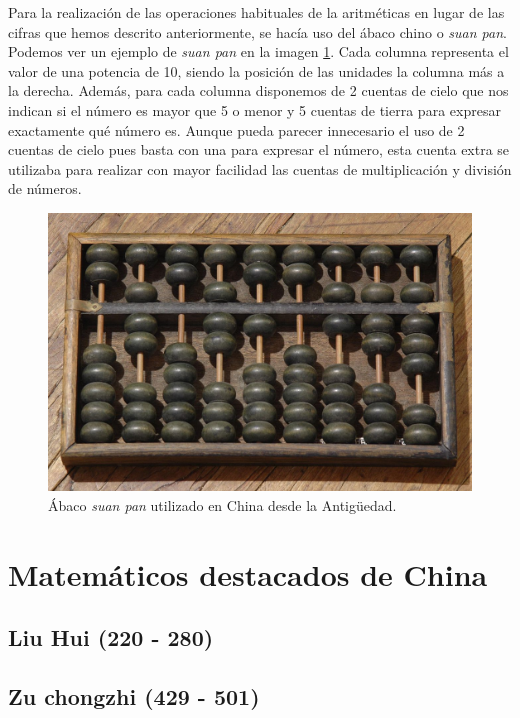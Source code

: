 \documentclass[a4paper, 11pt]{article}
\begin{document}
		Para la realización de las operaciones habituales de la aritméticas en lugar de las cifras que hemos descrito
		anteriormente, se hacía uso del ábaco chino o \textit{suan pan}. Podemos ver un ejemplo de \textit{suan pan} en
		la imagen \ref{fig:ch_abacus}. Cada columna representa el valor de una potencia de 10, siendo la posición
		de las unidades la columna más a la derecha. Además, para cada columna disponemos de 2 cuentas de cielo que nos
		indican si el número es mayor que 5 o menor y 5 cuentas de tierra para expresar exactamente qué número es.
		Aunque pueda parecer innecesario el uso de 2 cuentas de cielo pues basta con una para expresar el número, esta
		cuenta extra se utilizaba para realizar con mayor facilidad las cuentas de multiplicación y división de números.
		
		\begin{figure}[!ht]
			\centering
			\includegraphics[width = 14cm]{Chinese-abacus.jpg}
			\caption{Ábaco \textit{suan pan} utilizado en China desde la Antigüedad.}
			\label{fig:ch_abacus}
		\end{figure}

\section{Matemáticos destacados de China}

	\subsection{Liu Hui (220 - 280)}
	\subsection{Zu chongzhi (429 - 501)}
\end{document}
